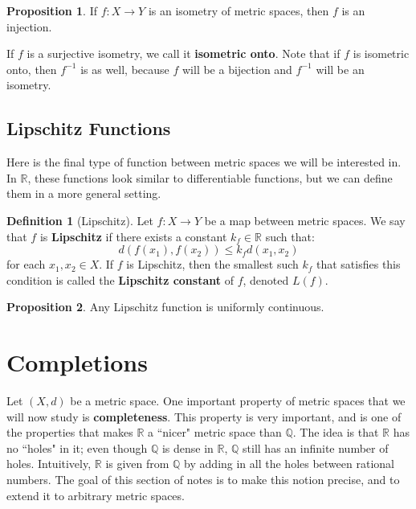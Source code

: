 \documentclass[11pt, oneside]{amsart}   	%
\theoremstyle{definition}
\newtheorem{definition}{Definition}[section]
\newtheorem{prop}{Proposition}[section]
\begin{document}
	\begin{prop}
		If $f : X\rightarrow Y$ is an isometry of metric spaces, then $f$ is an injection.
	\end{prop}
	
	If $f$ is a surjective isometry, we call it \textbf{isometric onto}. Note that if $f$ is isometric onto, then $f^{-1}$ is as well, because $f$ will be a bijection and 
	$f^{-1}$ will be an isometry.
	
	\subsection{Lipschitz Functions}
	
	Here is the final type of function between metric spaces we will be interested in. In $\mathbb R$, these functions look similar to differentiable functions, but 
	we can define them in a more general setting.
	
	\begin{definition}[Lipschitz]
		Let $f : X\rightarrow Y$ be a map between metric spaces. We say that $f$ is \textbf{Lipschitz} if there exists a constant $k_f\in\mathbb R$ such that:
		$$
			d(f(x_1), f(x_2)) \leq k_f d(x_1, x_2)
		$$
		for each $x_1, x_2\in X$. If $f$ is Lipschitz, then the smallest such $k_f$ that satisfies this condition is called the \textbf{Lipschitz constant} of $f$, denoted 
		$L(f)$.
	\end{definition}
	
	\begin{prop}
		Any Lipschitz function is uniformly continuous.
	\end{prop}
	
\section{Completions}

	Let $(X, d)$ be a metric space. One important property of metric spaces that we will now study is \textbf{completeness}. This property is very important, and is 
	one of the properties that makes $\mathbb R$ a ``nicer" metric space than $\mathbb Q$. The idea is that $\mathbb R$ has no ``holes" in it; even though 
	$\mathbb Q$ is dense in $\mathbb R$, $\mathbb Q$ still has an infinite number of holes. Intuitively, $\mathbb R$ is given from $\mathbb Q$ by adding in all the 
	holes between rational numbers. The goal of this section of notes is to make this notion precise, and to extend it to arbitrary metric spaces. 
	
\end{document}
